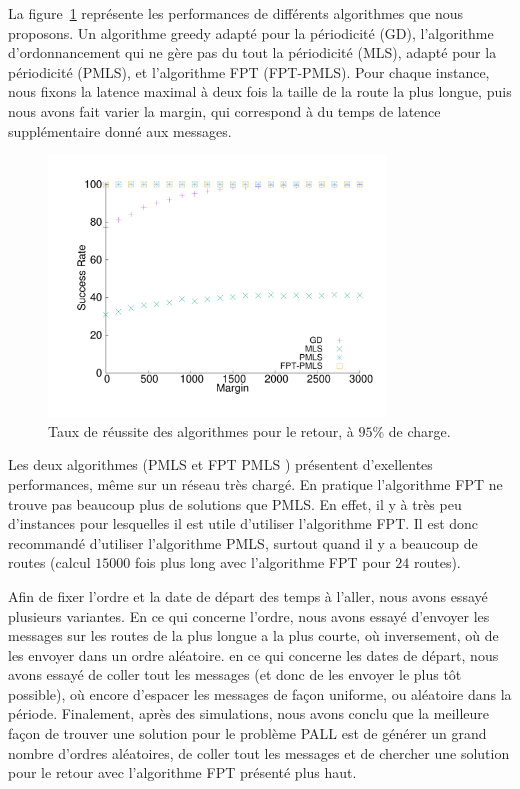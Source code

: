 \documentclass{article}
\begin{document}
La figure~\ref{fig:success21000} représente les performances de différents algorithmes que nous proposons. Un algorithme greedy adapté pour la périodicité (GD), l'algorithme d'ordonnancement qui ne gère pas du tout la périodicité (MLS), adapté pour la périodicité (PMLS), et l'algorithme FPT (FPT-PMLS).
Pour chaque instance, nous fixons la latence maximal à deux fois la taille de la route la plus longue, puis nous avons fait varier la margin, qui correspond à du temps de latence supplémentaire donné aux messages.

    \begin{figure} [h] 
       \begin{center}
      \includegraphics[width=0.8\textwidth]{retour_21000.pdf}
      \end{center}
      \caption{Taux de réussite des algorithmes pour le retour, à $95\%$ de charge.}
     \label{fig:success21000}
     \end{figure}
    
    Les deux algorithmes (PMLS et FPT PMLS ) présentent d'exellentes performances, même sur un réseau très chargé.
  En pratique l'algorithme FPT ne trouve pas beaucoup plus de solutions que PMLS. En effet, il y à très peu d'instances pour lesquelles il est utile d'utiliser l'algorithme FPT.
  Il est donc recommandé d'utiliser l'algorithme PMLS, surtout quand il y a beaucoup de routes (calcul $15000$ fois plus long avec l'algorithme FPT pour $24$ routes).

Afin de fixer l'ordre et la date de départ des temps à l'aller, nous avons essayé plusieurs variantes. En ce qui concerne l'ordre, nous avons essayé d'envoyer les messages sur les routes de la plus longue a la plus courte, où inversement, où de les envoyer dans un ordre aléatoire. en ce qui concerne les dates de départ, nous avons essayé de coller tout les messages (et donc de les envoyer le plus tôt possible), où encore d'espacer les messages de façon uniforme, ou aléatoire dans la période. Finalement, après des simulations, nous avons conclu que la meilleure façon de trouver une solution pour le problème PALL est de générer un grand nombre d'ordres aléatoires, de coller tout les messages et de chercher une solution pour le retour avec l'algorithme FPT présenté plus haut.
\end{document}

